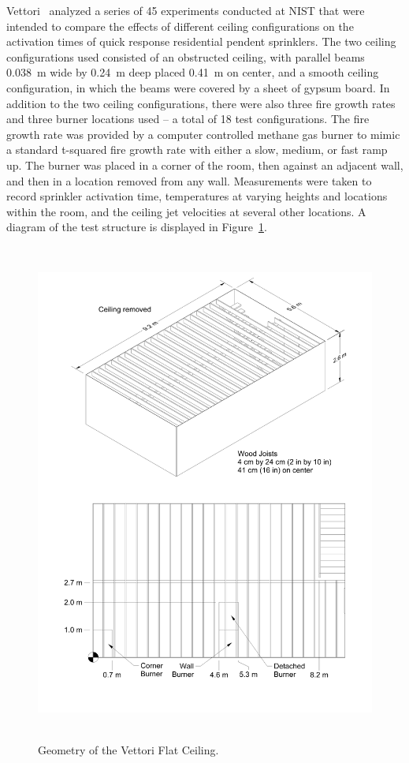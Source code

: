 Vettori~\cite{Vettori:1} analyzed a series of 45 experiments conducted at NIST that were intended to compare the effects of different ceiling configurations on the activation times of quick response residential pendent sprinklers. The two ceiling configurations used consisted of an obstructed ceiling, with parallel beams 0.038~m wide by 0.24~m deep placed 0.41~m on center, and a smooth ceiling configuration, in which the beams were covered by a sheet of gypsum board.  In addition to the two ceiling configurations, there were also three fire growth rates and three burner locations used -- a total of 18 test configurations. The fire growth rate was provided by a computer controlled methane gas burner to mimic a standard t-squared fire growth rate with either a slow, medium, or fast ramp up. The burner was placed in a corner of the room, then against an adjacent wall, and then in a location removed from any wall. Measurements were taken to record sprinkler activation time, temperatures at varying heights and locations within the room, and the ceiling jet velocities at several other locations.  A diagram of the test structure is displayed in Figure~\ref{Vettori_Drawing}.

\begin{figure}
\begin{center}
\includegraphics[height=6.5in]{FIGURES/Vettori_Flat_Ceiling/Vettori_Flat_Ceiling}
\end{center}
\caption{Geometry of the Vettori Flat Ceiling.}
\label{Vettori_Drawing}
\end{figure}


